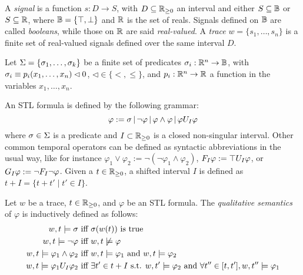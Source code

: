 A \emph{signal} is a function $s : D \to S$, with $D \subseteq \mathbb{R}_{\geq 0}$ 
an interval and either $S \subseteq \mathbb{B}$ or $S \subseteq \mathbb{R}$,
where $\mathbb{B} = \{\top, \bot\}$ and $\mathbb{R}$ is the set of reals. 
Signals defined on $\mathbb{B}$ are called \emph{booleans}, while
those on $\mathbb{R}$ are said \emph{real-valued}. 
A \emph{trace} $w = \{s_1,\dots, s_n\}$ is a finite set of real-valued signals
defined over the same interval $D$.

Let $\Sigma = \{\sigma_1, \dots, \sigma_k \}$ be a finite set of predicates $\sigma_i : \mathbb{R}^n \to \mathbb{B}$,
with $\sigma_i \equiv p_i(x_1, \dots, x_n) \lhd 0$, $\lhd \in \{ <, \leq \}$, and $p_i : \mathbb{R}^n \to \mathbb{R}$
a function in the variables $x_1, \dots, x_n$.

An STL formula is defined by the following grammar:
\begin{equation}
	\varphi := \sigma \, | \, \neg \varphi \, | \, 
                    \varphi \wedge \varphi \, | \, \varphi U_{I} \varphi
\end{equation}
where $\sigma \in \Sigma$ is a predicate and $I \subset \mathbb{R}_{\geq 0}$ is a closed
non-singular interval. Other common temporal operators
can be defined as syntactic abbreviations in the usual way, like for instance
$\varphi_1 \vee \varphi_2 := \neg ( \neg \varphi_1 \wedge \varphi_2 )$,
$F_{I} \varphi := \top U_{I} \varphi$, or $G_{I}\varphi := \neg F_{I} \neg \varphi$.
Given a $t \in \mathbb{R}_{\geq 0}$, a shifted interval $I$
is defined as $t + I = \{t + t' \mid t' \in I\}$.


\begin{definition}
	Let $w$ be a trace, $t \in \mathbb{R}_{\geq 0}$, and $\varphi$ be an STL formula.
	The \emph{qualitative semantics} of $\varphi$ is inductively defined as follows:
	\begin{equation}
		\begin{split}
			w,t \models  \sigma \text{ iff } 			&\sigma(w(t)) \text{ is true} \\
			w,t \models \neg\varphi \text{ iff } 		& w,t \not\models \varphi \\
			w,t \models \varphi_1 \wedge \varphi_2 \text{ iff }	& w,t \models \varphi_1 \text{ and } w,t \models \varphi_2 \\
			w,t \models \varphi_1 U_{I} \varphi_2 \text{ iff }	& \exists t' \in t + I \text{ s.t. } w,t' \models \varphi_2 \text{ and } \forall t'' \in [t,t'], w,t'' \models \varphi_1 \\
		\end{split}
	\end{equation}
\end{definition}

